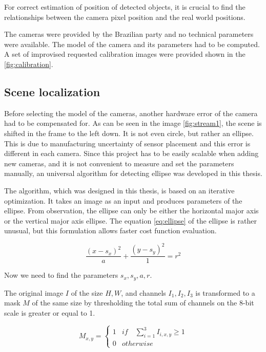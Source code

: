 \documentclass[a4paper,11pt,titlepage,twoside]{article}
\numberwithin{figure}{section}
\begin{document}
For correct estimation of position of detected objects, it is crucial to find the relationships between the camera pixel position and the real world positions. 

The cameras were provided by the Brazilian party and no technical parameters were available. The model of the camera and its parameters had to be computed. A set of improvised requested calibration images were provided shown in the \ref{fig:calibration}.

\subsection{Scene localization}
\label{sec:scene_localization}
Before selecting the model of the cameras, another hardware error of the camera had to be compensated for. As can be seen in the image \ref{fig:stream1}, the scene is shifted in the frame to the left down. It is not even circle, but rather an ellipse. This is due to manufacturing uncertainty of sensor placement and this error is different in each camera. Since this project has to be easily scalable when adding new cameras, and it is not convenient to measure and set the parameters manually, an universal algorithm for detecting ellipse was developed in this thesis.

The algorithm, which was designed in this thesis, is based on an iterative optimization. It takes an image as an input and produces parameters of the ellipse. From observation, the ellipse can only be either the horizontal major axis or the vertical major axis ellipse. The equation \ref{eq:ellipse} of the ellipse is rather unusual, but this formulation allows faster cost function evaluation.

\begin{equation}
\label{eq:ellipse}
\frac{(x-s_x)^2}{a} + \frac{(y-s_y)^2}{1} = r^2
\end{equation}

Now we need to find the parameters $s_x, s_y, a, r$.

The original image $I$ of the size $H, W$, and channels $I_1, I_2, I_3$ is transformed to a mask $M$ of the same size by thresholding the total sum of channels on the 8-bit scale is greater or equal to 1. 

\begin{equation}
M_{x,y} = \begin{cases}
1 & if \quad \sum_{i=1}^{3} I_{i,x,y} \geq 1 \\
0 & otherwise
\end{cases}
\end{equation}
\end{document}
